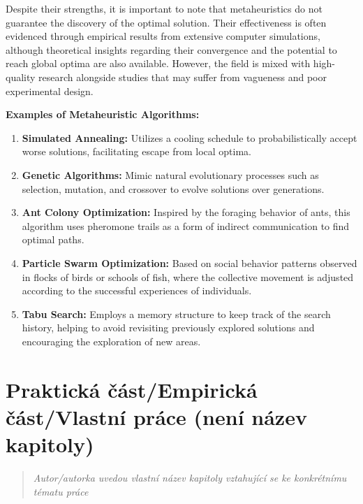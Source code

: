 \documentclass[
]{article}
\begin{document}
Despite their strengths, it is important to note that metaheuristics do not guarantee the discovery of the optimal solution. Their effectiveness is often evidenced through empirical results from extensive computer simulations, although theoretical insights regarding their convergence and the potential to reach global optima are also available. However, the field is mixed with high-quality research alongside studies that may suffer from vagueness and poor experimental design.

\textbf{Examples of Metaheuristic Algorithms:}
\begin{enumerate}
    \item \textbf{Simulated Annealing:} Utilizes a cooling schedule to probabilistically accept worse solutions, facilitating escape from local optima.
    \item \textbf{Genetic Algorithms:} Mimic natural evolutionary processes such as selection, mutation, and crossover to evolve solutions over generations.
    \item \textbf{Ant Colony Optimization:} Inspired by the foraging behavior of ants, this algorithm uses pheromone trails as a form of indirect communication to find optimal paths.
    \item \textbf{Particle Swarm Optimization:} Based on social behavior patterns observed in flocks of birds or schools of fish, where the collective movement is adjusted according to the successful experiences of individuals.
    \item \textbf{Tabu Search:} Employs a memory structure to keep track of the search history, helping to avoid revisiting previously explored solutions and encouraging the exploration of new areas.
\end{enumerate}





\newpage
\hypertarget{praktickuxe1-ux10duxe1stempirickuxe1-ux10duxe1stvlastnuxed-pruxe1ce-nenuxed-nuxe1zev-kapitoly}{%
\section{Praktická část/Empirická část/Vlastní práce (není název
kapitoly)}\label{praktickuxe1-ux10duxe1stempirickuxe1-ux10duxe1stvlastnuxed-pruxe1ce-nenuxed-nuxe1zev-kapitoly}}

\begin{quote}
\emph{Autor/autorka uvedou vlastní název kapitoly vztahující se ke
konkrétnímu tématu práce}
\end{quote}
\end{document}
